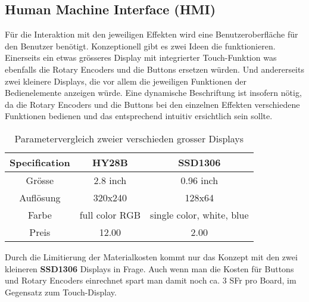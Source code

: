 \subsection{Human Machine Interface (HMI)}
\label{subsec:Konzept_HMI}

Für die Interaktion mit den jeweiligen Effekten wird eine Benutzeroberfläche für den Benutzer benötigt. Konzeptionell gibt es zwei Ideen die funktionieren. Einerseits ein etwas grösseres Display mit integrierter Touch-Funktion was ebenfalls die Rotary Encoders und die Buttons ersetzen würden. Und andererseits zwei kleinere Displays, die vor allem die jeweiligen Funktionen der Bedienelemente anzeigen würde. Eine dynamische Beschriftung ist insofern nötig, da die Rotary Encoders und die Buttons bei den einzelnen Effekten verschiedene Funktionen bedienen und das entsprechend intuitiv ersichtlich sein sollte.

\begin{table}[H]
	\centering
	\begin{tabular}{|c|c|c|}
		\hline
		\textbf{Specification} & \textbf{HY28B}             & \textbf{SSD1306} \\ \hline
		Grösse              & 2.8 inch                & 0.96 inch    \\ \hline
		Auflösung           & 320x240                         & 128x64      \\ \hline
		Farbe              & full color RGB & single color, white, blue    \\ \hline
		Preis         & 12.00                         & 2.00            \\ \hline
	\end{tabular}
	\caption{Parametervergleich zweier verschieden grosser Displays}
	\label{tab:displays}
\end{table}

Durch die Limitierung der Materialkosten kommt nur das Konzept mit den zwei kleineren \textbf{SSD1306} Displays in Frage. Auch wenn man die Kosten für Buttons und Rotary Encoders einrechnet spart man damit noch ca. 3 SFr pro Board, im Gegensatz zum Touch-Display.